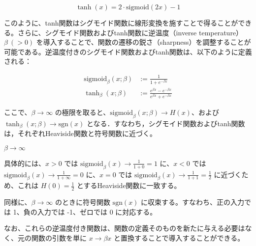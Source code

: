 \documentclass[titlepage]{ltjsbook}
\begin{document}
\begin{equation}
\tanh(x) = 2\cdot \mathrm{sigmoid}(2x) - 1
\end{equation}

このように、tanh関数はシグモイド関数に線形変換を施すことで得ることができる。さらに、シグモイド関数およびtanh関数に逆温度（inverse temperature）$\beta\ (>0)$ を導入することで、関数の遷移の鋭さ（sharpness）を調整することが可能である。逆温度付きのシグモイド関数およびtanh関数は、以下のように定義される：

\begin{align}
\mathrm{sigmoid}_\beta(x; \beta)&:= \frac{1}{1 + e^{-\beta x}}\\
\tanh_\beta(x; \beta)&:= \frac{e^{\beta x} - e^{-\beta x}}{e^{\beta x} + e^{-\beta x}}
\end{align}

ここで、$\beta \to \infty$ の極限を取ると、$\mathrm{sigmoid}_\beta(x; \beta) \to H(x)$、および $\tanh_\beta(x; \beta) \to \mathrm{sgn}(x)$ となる．すなわち，シグモイド関数およびtanh関数は，それぞれHeaviside関数と符号関数に近づく。

$\beta \to \infty$

具体的には、$x > 0$ では $\mathrm{sigmoid}_\beta(x)\to \frac{1}{1+0}=1$ 
に、$x < 0$ では $\mathrm{sigmoid}_\beta(x)\to \frac{1}{1+\infty}=0$ に、$x = 0$ では $\mathrm{sigmoid}_\beta(x) \to \frac{1}{1+1} = \frac{1}{2}$ に近づくため、これは $H(0) = \frac{1}{2}$ とするHeaviside関数に一致する。

同様に、$\beta \to \infty$ のときに符号関数 $\mathrm{sgn}(x)$ に収束する。すなわち、正の入力では 1、負の入力では -1、ゼロでは 0 に対応する。

なお、これらの逆温度付き関数は、関数の定義そのものを新たに与える必要はなく、元の関数の引数を単に $x \to \beta x$ と置換することで導入することができる。
\end{document}
